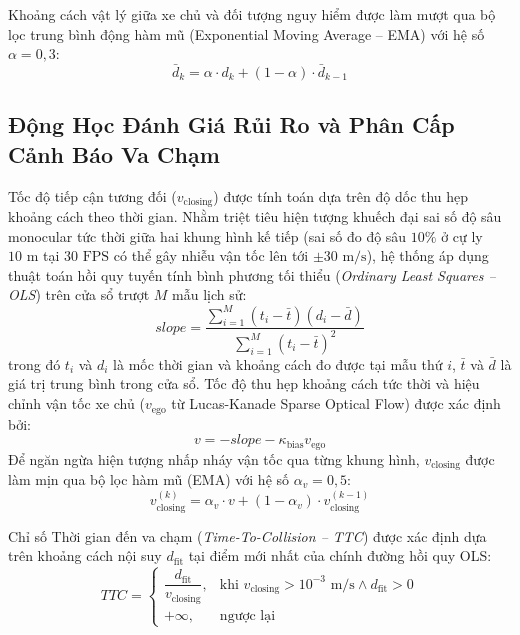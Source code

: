 \documentclass[12pt,a4paper]{article}
\begin{document}
Khoảng cách vật lý giữa xe chủ và đối tượng nguy hiểm được làm mượt qua bộ lọc trung bình động hàm mũ (Exponential Moving Average -- EMA) với hệ số $\alpha = 0,3$:
\begin{equation}
\label{eq:ema_distance}
\bar{d}_k = \alpha \cdot d_k + (1 - \alpha) \cdot \bar{d}_{k-1}
\end{equation}

\subsection{Động Học Đánh Giá Rủi Ro và Phân Cấp Cảnh Báo Va Chạm}
Tốc độ tiếp cận tương đối ($v_{\text{closing}}$) được tính toán dựa trên độ dốc thu hẹp khoảng cách theo thời gian. Nhằm triệt tiêu hiện tượng khuếch đại sai số độ sâu monocular tức thời giữa hai khung hình kế tiếp (sai số đo độ sâu $10\%$ ở cự ly $10\text{ m}$ tại $30\text{ FPS}$ có thể gây nhiễu vận tốc lên tới $\pm 30\text{ m/s}$), hệ thống áp dụng thuật toán hồi quy tuyến tính bình phương tối thiểu (\textit{Ordinary Least Squares -- OLS}) trên cửa sổ trượt $M$ mẫu lịch sử:
\begin{equation}
\label{eq:ols_slope}
slope = \frac{\sum_{i=1}^M (t_i - \bar{t})(d_i - \bar{d})}{\sum_{i=1}^M (t_i - \bar{t})^2}
\end{equation}
trong đó $t_i$ và $d_i$ là mốc thời gian và khoảng cách đo được tại mẫu thứ $i$, $\bar{t}$ và $\bar{d}$ là giá trị trung bình trong cửa sổ. Tốc độ thu hẹp khoảng cách tức thời và hiệu chỉnh vận tốc xe chủ ($v_{\text{ego}}$ từ Lucas-Kanade Sparse Optical Flow) được xác định bởi:
\begin{equation}
\label{eq:closing_speed_raw}
v = -slope - \kappa_{\text{bias}} v_{\text{ego}}
\end{equation}
Để ngăn ngừa hiện tượng nhấp nháy vận tốc qua từng khung hình, $v_{\text{closing}}$ được làm mịn qua bộ lọc hàm mũ (EMA) với hệ số $\alpha_v = 0,5$:
\begin{equation}
\label{eq:closing_speed_ema}
v_{\text{closing}}^{(k)} = \alpha_v \cdot v + (1 - \alpha_v) \cdot v_{\text{closing}}^{(k-1)}
\end{equation}

Chỉ số Thời gian đến va chạm (\textit{Time-To-Collision -- TTC}) được xác định dựa trên khoảng cách nội suy $d_{\text{fit}}$ tại điểm mới nhất của chính đường hồi quy OLS:
\begin{equation}
\label{eq:ttc_metric}
TTC = \begin{cases}
\dfrac{d_{\text{fit}}}{v_{\text{closing}}}, & \text{khi } v_{\text{closing}} > 10^{-3}\text{ m/s} \land d_{\text{fit}} > 0 \\
+\infty, & \text{ngược lại}
\end{cases}
\end{equation}
\end{document}
